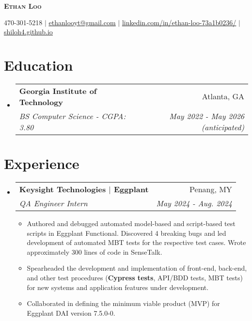\documentclass[letterpaper,11pt]{article}
\makeatletter
\newcommand{\resumeItem}[1]{
  \item\small{
    {#1 \vspace{-2pt}}
  }
}
\newcommand{\resumeSubheading}[4]{
  \vspace{-2pt}\item
    \begin{tabular*}{0.97\textwidth}[t]{l@{\extracolsep{\fill}}r}
      \textbf{#1} & #2 \\
      \textit{\small#3} & \textit{\small #4} \\
    \end{tabular*}\vspace{-7pt}
}
\newcommand{\resumeSubHeadingListStart}{\begin{itemize}[leftmargin=0.15in, label={}]}
\newcommand{\resumeSubHeadingListEnd}{\end{itemize}}
\newcommand{\resumeItemListStart}{\begin{itemize}}
\newcommand{\resumeItemListEnd}{\end{itemize}\vspace{-8pt}}
\makeatother
\begin{document}
\begin{center}
  \vspace*{-25pt}
    \textbf{\huge \scshape Ethan Loo}
  \vspace*{-9pt}
\end{center}

\begin{center}
\small 470-301-5218 $|$
\href{mailto:ethanlooyt@gmail.com}{\underline{ethanlooyt@gmail.com}} $|$
\href{https://www.linkedin.com/in/ethan-loo-73a1b0236/}{\underline{linkedin.com/in/ethan-loo-73a1b0236/}} $|$
\href{https://shiloh4.github.io/}{\underline{shiloh4.github.io}}
\vspace*{-10pt}
\end{center}


\section{Education}
  \resumeSubHeadingListStart
    \resumeSubheading
      {Georgia Institute of Technology}{Atlanta, GA}
      {BS Computer Science - CGPA: 3.80}{May 2022 - May 2026 (anticipated)}
  \resumeSubHeadingListEnd

\section{Experience}
\resumeSubHeadingListStart

  \resumeSubheading
    {Keysight Technologies $|$ Eggplant}{Penang, MY}
    {QA Engineer Intern}{May 2024 - Aug. 2024}
    \resumeItemListStart
      \resumeItem{Authored and debugged automated model-based and script-based test scripts in Eggplant Functional. Discovered 4 breaking bugs and led development of automated MBT tests for the respective test cases. Wrote approximately 300 lines of code in SenseTalk.}
      \resumeItem{Spearheaded the development and implementation of front-end, back-end, and other test procedures (\textbf{Cypress tests}, API/BDD tests, MBT tests) for new systems and application features under development.}
      \resumeItem{Collaborated in defining the minimum viable product (MVP) for Eggplant DAI version 7.5.0-0.}
    \resumeItemListEnd

\resumeSubHeadingListEnd


\end{document}

